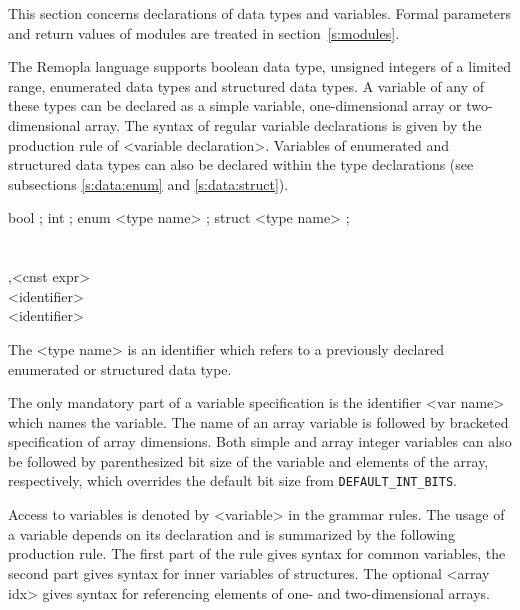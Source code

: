 \documentclass[a4paper,11pt,titlepage,english]{article}
\begin{document}
This section concerns declarations of data types and variables. Formal
parameters and return values of modules are treated in
section~\ref{s:modules}.

The Remopla language supports boolean data type, unsigned integers
of a limited range, enumerated data types and structured data types.
A variable of any of these types can be declared as a simple variable,
one-dimensional array or two-dimensional array. The syntax of regular
variable declarations is given by the production rule of <variable
declaration>. Variables of enumerated and structured data types can also be
declared within the type declarations (see subsections \ref{s:data:enum}
and \ref{s:data:struct}).

\begin{bnfgrammar}
 \is bool  ;
    \or int  ;
    \or enum <type name>  ;
    \or struct <type name>  ;
    \\
[variable spec] \optional{[<dimen>]}\optional{[<dimen>]}\\
[int variable spec] \\
[dimen]  ,<cnst expr> \\
[type name] \is <identifier> \\
[var name] \is <identifier> \\
\end{bnfgrammar}

The <type name> is an identifier which refers to a previously declared
enumerated or structured data type.

The only mandatory part of a variable specification is the identifier <var
name> which names the variable. The name of an array variable is followed
by bracketed specification of array dimensions. Both simple and array
integer variables can also be followed by parenthesized bit size of the
variable and elements of the array, respectively, which overrides the
default bit size from \verb|DEFAULT_INT_BITS|.


Access to variables is denoted by <variable> in the grammar rules.  The
usage of a variable depends on its declaration and is summarized by the
following production rule. The first part of the rule gives syntax for
common variables, the second part gives syntax for inner variables of
structures. The optional <array idx> gives syntax for referencing elements
of one- and two-dimensional arrays. 
\end{document}
